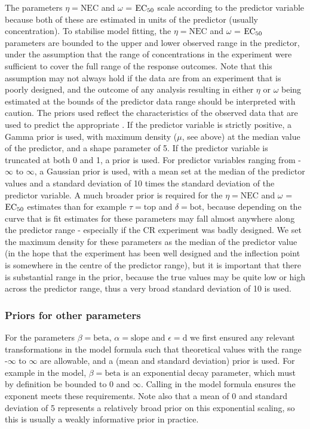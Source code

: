 \documentclass[
  shortnames]{jss}
\begin{document}
The parameters \(\eta = \text{NEC}\) and \(\omega\) = \(\text{EC\textsubscript{50}}\) scale according to the predictor variable because both of these are estimated in units of the predictor (usually concentration). To stabilise model fitting, the \(\eta = \text{NEC}\) and \(\omega\) = \(\text{EC\textsubscript{50}}\) parameters are bounded to the upper and lower observed range in the predictor, under the assumption that the range of concentrations in the experiment were sufficient to cover the full range of the response outcomes. Note that this assumption may not always hold if the data are from an experiment that is poorly designed, and the outcome of any analysis resulting in either \(\eta\) or \(\omega\) being estimated at the bounds of the predictor data range should be interpreted with caution. The priors used reflect the characteristics of the observed data that are used to predict the appropriate . If the predictor variable is strictly positive, a Gamma prior is used, with maximum density (\(\mu\), see above) at the median value of the predictor, and a shape parameter of 5. If the predictor variable is truncated at both 0 and 1, a  prior is used. For predictor variables ranging from -\(\infty\) to \(\infty\), a Gaussian prior is used, with a mean set at the median of the predictor values and a standard deviation of 10 times the standard deviation of the predictor variable. A much broader prior is required for the \(\eta = \text{NEC}\) and \(\omega\) = \(\text{EC\textsubscript{50}}\) estimates than for example \(\tau = \text{top}\) and \(\delta = \text{bot}\), because depending on the curve that is fit estimates for these parameters may fall almost anywhere along the predictor range - especially if the CR experiment was badly designed. We set the maximum density for these parameters as the median of the predictor value (in the hope that the experiment has been well designed and the inflection point is somewhere in the centre of the predictor range), but it is important that there is substantial range in the prior, because the true values may be quite low or high across the predictor range, thus a very broad standard deviation of 10 is used.

\hypertarget{priors-for-other-parameters}{%
\subsubsection{Priors for other parameters}\label{priors-for-other-parameters}}

For the parameters \(\beta = \text{beta}\), \(\alpha = \text{slope}\) and \(\epsilon = \text{d}\) we first ensured any relevant transformations in the model formula such that theoretical values with the range -\(\infty\) to \(\infty\) are allowable, and a  (mean and standard deviation) prior is used. For example in the  model, \(\beta = \text{beta}\) is an exponential decay parameter, which must by definition be bounded to 0 and \(\infty\). Calling  in the model formula ensures the exponent meets these requirements. Note also that a mean of 0 and standard deviation of 5 represents a relatively broad prior on this exponential scaling, so this is usually a weakly informative prior in practice.
\end{document}
